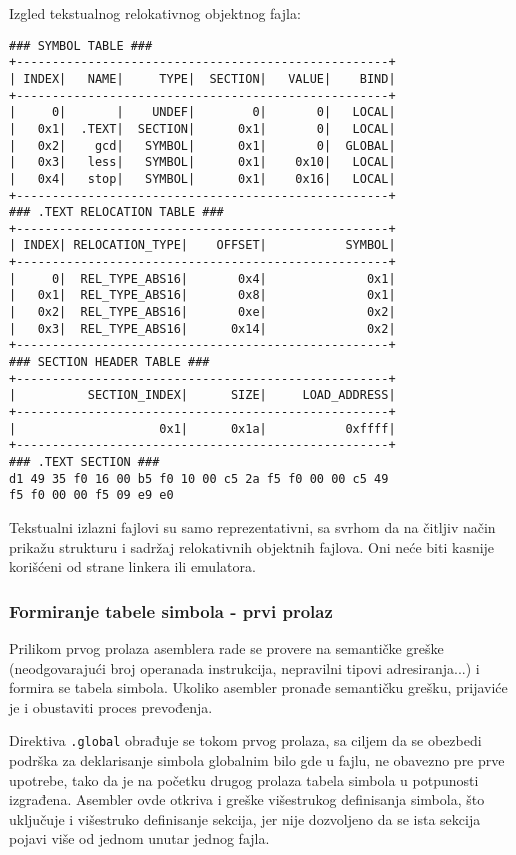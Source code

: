 \noindent
Izgled tekstualnog relokativnog objektnog fajla:
\begin{lstlisting}
### SYMBOL TABLE ###
+----------------------------------------------------+
| INDEX|   NAME|     TYPE|  SECTION|   VALUE|    BIND|
+----------------------------------------------------+
|     0|       |    UNDEF|        0|       0|   LOCAL|
|   0x1|  .TEXT|  SECTION|      0x1|       0|   LOCAL|
|   0x2|    gcd|   SYMBOL|      0x1|       0|  GLOBAL|
|   0x3|   less|   SYMBOL|      0x1|    0x10|   LOCAL|
|   0x4|   stop|   SYMBOL|      0x1|    0x16|   LOCAL|
+----------------------------------------------------+
### .TEXT RELOCATION TABLE ###
+----------------------------------------------------+
| INDEX| RELOCATION_TYPE|    OFFSET|           SYMBOL|
+----------------------------------------------------+
|     0|  REL_TYPE_ABS16|       0x4|              0x1|
|   0x1|  REL_TYPE_ABS16|       0x8|              0x1|
|   0x2|  REL_TYPE_ABS16|       0xe|              0x2|
|   0x3|  REL_TYPE_ABS16|      0x14|              0x2|
+----------------------------------------------------+
### SECTION HEADER TABLE ###
+----------------------------------------------------+
|          SECTION_INDEX|      SIZE|     LOAD_ADDRESS|
+----------------------------------------------------+
|                    0x1|      0x1a|           0xffff|
+----------------------------------------------------+
### .TEXT SECTION ###
d1 49 35 f0 16 00 b5 f0 10 00 c5 2a f5 f0 00 00 c5 49
f5 f0 00 00 f5 09 e9 e0
\end{lstlisting}
Tekstualni izlazni fajlovi su samo reprezentativni,
sa svrhom da na čitljiv način prikažu strukturu i sadržaj
relokativnih objektnih fajlova. Oni neće biti kasnije
korišćeni od strane linkera ili emulatora.

\subsubsection{Formiranje tabele simbola - prvi prolaz}
Prilikom prvog prolaza asemblera rade se provere na semantičke greške
(neo\-dgovarajući broj operanada instrukcija, nepravilni tipovi adresiranja...)
i formira se tabela simbola. Ukoliko asembler pronađe semantičku grešku,
prijaviće je i obustaviti proces prevođenja.

Direktiva \texttt{.global}
obrađuje se tokom prvog prolaza, sa ciljem da se obezbedi podrška za deklarisanje
simbola globalnim bilo gde u fajlu, ne obavezno pre prve upotrebe,
tako da je na početku drugog prolaza tabela simbola u potpunosti izgrađena.
Asembler ovde otkriva i greške višestrukog definisanja simbola, što uključuje
i višestru\-ko definisanje sekcija, jer nije dozvoljeno da se ista sekcija
pojavi više od jednom unutar jednog fajla.

